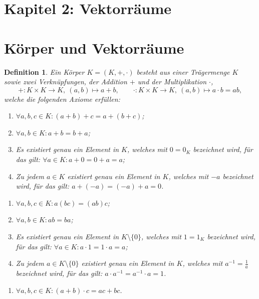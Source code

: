 \documentclass[a4paper]{article}
\theoremstyle{kurzskript}
\newtheorem{definition}[satz]{Definition}
\begin{document}
\section*{Kapitel 2: Vektorräume}

\section{Körper und Vektorräume}

\begin{definition}
Ein \emph{Körper} $K = (K, +, \cdot)$ besteht aus einer Trägermenge $K$ sowie zwei Verknüpfungen, der \emph{Addition} $+$ und der \emph{Multiplikation} $\cdot$,
\[
  +\colon K \times K \to K,\ (a, b) \mapsto a + b, \qquad
  \cdot\colon K \times K \to K,\ (a, b) \mapsto a \cdot b = ab,
\]
welche die folgenden Axiome erfüllen:
\begin{enumerate}[label=(\textup{A\arabic*}),leftmargin=3.2em]
  \item $\forall a, b, c \in K\colon (a + b) + c = a + (b + c)$;
  \item $\forall a, b \in K\colon a + b = b + a$;
  \item Es existiert genau ein Element in $K$, welches mit $0 = 0_K$ bezeichnet wird, für das gilt: $\forall a \in K\colon a + 0 = 0 + a = a$;
  \item Zu jedem $a \in K$ existiert genau ein Element in $K$, welches mit $-a$ bezeichnet wird, für das gilt: $a + (-a) = (-a) + a = 0$.
\end{enumerate}
\begin{enumerate}[label=(\textup{M\arabic*}),leftmargin=3.2em]
  \item $\forall a, b, c \in K\colon a(bc) = (ab)c$;
  \item $\forall a, b \in K\colon ab = ba$;
  \item Es existiert genau ein Element in $K \setminus \{0\}$, welches mit $1 = 1_K$ bezeichnet wird, für das gilt: $\forall a \in K\colon a \cdot 1 = 1 \cdot a = a$;
  \item Zu jedem $a \in K \setminus \{0\}$ existiert genau ein Element in $K$, welches mit $a^{-1} = \frac{1}{a}$ bezeichnet wird, für das gilt: $a \cdot a^{-1} = a^{-1} \cdot a = 1$.
\end{enumerate}
\begin{enumerate}[label=(\textup{D}),leftmargin=3.2em]
  \item $\forall a, b, c \in K\colon (a + b) \cdot c = ac + bc$.
\end{enumerate}
\end{definition}
\end{document}
